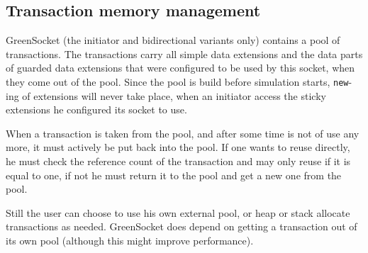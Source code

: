 \documentclass[a4paper,10pt]{article}          %
\begin{document}
\subsection{Transaction memory management}
\vspace{4mm}

GreenSocket (the initiator and bidirectional variants only) contains a pool of transactions. The transactions carry all simple data extensions and the data parts of guarded data extensions that were configured to be used by this socket, when they come out of the pool. Since the pool is build before simulation starts, \verb|new|-ing of extensions will never take place, when an initiator access the sticky extensions he configured its socket to use.

When a transaction is taken from the pool, and after some time is not of use any more, it must actively be put back into the pool. If one wants to reuse directly, he must check the reference count of the transaction and may only reuse if it is equal to one, if not he must return it to the pool and get a new one from the pool.

Still the user can choose to use his own external pool, or heap or stack allocate transactions as needed. GreenSocket does depend on getting a transaction out of its own pool (although this might improve performance).



\end{document}
